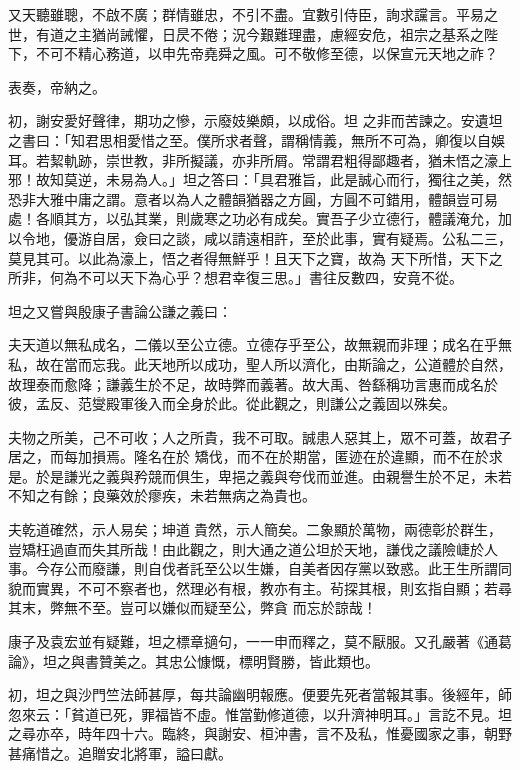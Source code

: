 \begin{pinyinscope}
 又天聽雖聰，不啟不廣；群情雖忠，不引不盡。宜數引侍臣，詢求讜言。平易之世，有道之主猶尚誡懼，日昃不倦；況今艱難理盡，慮經安危，祖宗之基系之陛下，不可不精心務道，以申先帝堯舜之風。可不敬修至德，以保宣元天地之祚？



 表奏，帝納之。



 初，謝安愛好聲律，期功之慘，示廢妓樂頗，以成俗。坦
 之非而苦諫之。安遺坦之書曰：「知君思相愛惜之至。僕所求者聲，謂稱情義，無所不可為，卿復以自娛耳。若絜軌跡，崇世教，非所擬議，亦非所屑。常謂君粗得鄙趣者，猶未悟之濠上邪！故知莫逆，未易為人。」坦之答曰：「具君雅旨，此是誠心而行，獨往之美，然恐非大雅中庸之謂。意者以為人之體韻猶器之方圓，方圓不可錯用，體韻豈可易處！各順其方，以弘其業，則歲寒之功必有成矣。實吾子少立德行，體議淹允，加以令地，優游自居，僉曰之談，咸以請遠相許，至於此事，實有疑焉。公私二三，莫見其可。以此為濠上，悟之者得無鮮乎！且天下之寶，故為
 天下所惜，天下之所非，何為不可以天下為心乎？想君幸復三思。」書往反數四，安竟不從。



 坦之又嘗與殷康子書論公謙之義曰：



 夫天道以無私成名，二儀以至公立德。立德存乎至公，故無親而非理；成名在乎無私，故在當而忘我。此天地所以成功，聖人所以濟化，由斯論之，公道體於自然，故理泰而愈降；謙義生於不足，故時弊而義著。故大禹、咎繇稱功言惠而成名於彼，孟反、范燮殿軍後入而全身於此。從此觀之，則謙公之義固以殊矣。



 夫物之所美，己不可收；人之所貴，我不可取。誠患人惡其上，眾不可蓋，故君子居之，而每加損焉。隆名在於
 矯伐，而不在於期當，匿迹在於違顯，而不在於求是。於是謙光之義與矜競而俱生，卑挹之義與夸伐而並進。由親譽生於不足，未若不知之有餘；良藥效於瘳疾，未若無病之為貴也。



 夫乾道確然，示人易矣；坤道貴然，示人簡矣。二象顯於萬物，兩德彰於群生，豈矯枉過直而失其所哉！由此觀之，則大通之道公坦於天地，謙伐之議險崨於人事。今存公而廢謙，則自伐者託至公以生嫌，自美者因存黨以致惑。此王生所謂同貌而實異，不可不察者也，然理必有根，教亦有主。茍探其根，則玄指自顯；若尋其末，弊無不至。豈可以嫌似而疑至公，弊貪
 而忘於諒哉！



 康子及袁宏並有疑難，坦之標章擿句，一一申而釋之，莫不厭服。又孔嚴著《通葛論》，坦之與書贊美之。其忠公慷慨，標明賢勝，皆此類也。



 初，坦之與沙門竺法師甚厚，每共論幽明報應。便要先死者當報其事。後經年，師忽來云：「貧道已死，罪福皆不虛。惟當勤修道德，以升濟神明耳。」言訖不見。坦之尋亦卒，時年四十六。臨終，與謝安、桓沖書，言不及私，惟憂國家之事，朝野甚痛惜之。追贈安北將軍，謚曰獻。




\end{pinyinscope}

